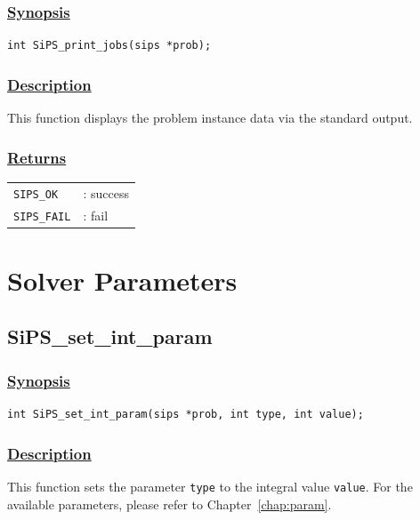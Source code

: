 \documentclass[a4paper]{book}
\begin{document}
\subsubsection{\underline{Synopsis}}

\begin{verbatim}
int SiPS_print_jobs(sips *prob);
\end{verbatim}

\subsubsection{\underline{Description}}

This function displays the problem instance data via the standard output.

\subsubsection{\underline{Returns}}

\begin{tabular}{ll}
  \verb+SIPS_OK+  &: success\\
  \verb+SIPS_FAIL+&: fail\\
\end{tabular}

\section{Solver Parameters}

\hypertarget{SiPS_set_int_param}{%
\subsection{SiPS\_set\_int\_param}
}


\subsubsection{\underline{Synopsis}}

\begin{verbatim}
int SiPS_set_int_param(sips *prob, int type, int value);
\end{verbatim}

\subsubsection{\underline{Description}}

This function sets the parameter \verb+type+ to the integral value \verb+value+.
For the available parameters, please refer to Chapter~\ref{chap:param}.
\end{document}
